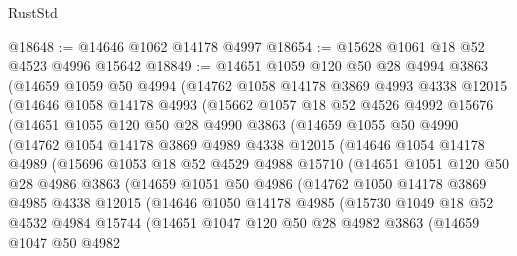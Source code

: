 \begin{lexlean}{RustStd}
\begin{coremodule}
@18648 := @14646 @1062 @14178 @4997
@18654 := @15628 @1061 @18 @52 @4523 @4996 @15642
@18849 := @14651
    @1059
    @120
    @50
    @28
    @4994
    @3863
    (@14659
      @1059
      @50
      @4994
      (@14762
        @1058
        @14178
        @3869
        @4993
        @4338
        @12015
        (@14646
          @1058
          @14178
          @4993
          (@15662
            @1057
            @18
            @52
            @4526
            @4992
            @15676
            (@14651
              @1055
              @120
              @50
              @28
              @4990
              @3863
              (@14659
                @1055
                @50
                @4990
                (@14762
                  @1054
                  @14178
                  @3869
                  @4989
                  @4338
                  @12015
                  (@14646
                    @1054
                    @14178
                    @4989
                    (@15696
                      @1053
                      @18
                      @52
                      @4529
                      @4988
                      @15710
                      (@14651
                        @1051
                        @120
                        @50
                        @28
                        @4986
                        @3863
                        (@14659
                          @1051
                          @50
                          @4986
                          (@14762
                            @1050
                            @14178
                            @3869
                            @4985
                            @4338
                            @12015
                            (@14646
                              @1050
                              @14178
                              @4985
                              (@15730
                                @1049
                                @18
                                @52
                                @4532
                                @4984
                                @15744
                                (@14651
                                  @1047
                                  @120
                                  @50
                                  @28
                                  @4982
                                  @3863
                                  (@14659
                                    @1047
                                    @50
                                    @4982

\end{coremodule}
\end{lexlean}
